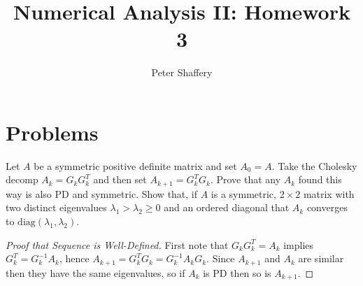 \documentclass[10pt,a4paper]{article}
\newenvironment{problem}[2][Problem]{\begin{trivlist}
\item[\hskip \labelsep {\bfseries #1}\hskip \labelsep {\bfseries #2.}]}{\end{trivlist}}
\begin{document}
\author{Peter Shaffery}
\title{Numerical Analysis II: Homework 3}
\maketitle
\section{Problems}
\begin{problem}{1}
  Let $A$ be a symmetric positive definite matrix and set $A_0 = A$.  Take the Cholesky decomp $A_k = G_k G_k^T$ and then set $A_{k+1} = G_k^T G_k$.  Prove that any $A_k$ found this way is also PD and symmetric.  Show that, if $A$ is a symmetric, $2 \times 2$ matrix with two distinct eigenvalues $\lambda_1 > \lambda_2 \geq 0$ and an ordered diagonal that $A_k$ converges to $\text{diag}(\lambda_1, \lambda_2)$. 
\end{problem}
\begin{proof}[Proof that Sequence is Well-Defined]
  First note that $G_k G_k^T = A_k$ implies $G_k^T = G_k^{-1} A_k$, hence $A_{k+1} = G_k^T G_k = G_k^{-1} A_k G_k$.  Since $A_{k+1}$ and $A_k$ are similar then they have the same eigenvalues, so if $A_k$ is PD then so is $A_{k+1}$.
\end{proof}
\end{document}
